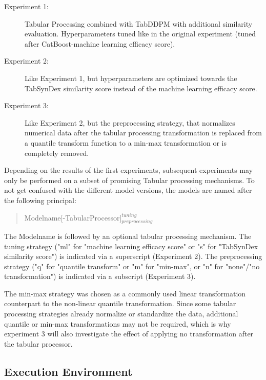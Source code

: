 \begin{description}
	\item[Experiment 1:] Tabular Processing combined with TabDDPM with additional similarity evaluation. Hyperparameters tuned like in the original experiment (tuned after CatBoost-machine learning efficacy score).
	\item[Experiment 2:] Like Experiment 1, but hyperparameters are optimized towards the TabSynDex similarity score instead of the machine learning efficacy score.
	\item[Experiment 3:] Like Experiment 2, but the preprocessing strategy, that normalizes numerical data after the tabular processing transformation is replaced from a quantile transform function to a min-max transformation or is completely removed.
\end{description}

\noindent Depending on the results of the first experiments, subsequent experiments may only be performed on a subset of promising Tabular processing mechanisms.
To not get confused with the different model versions, the models are named after the following principal:
\begin{quote}
Modelname[-TabularProcessor]$^{tuning}_{preprocessing}$
\end{quote}
The Modelname is followed by an optional tabular processing mechanism.
The tuning strategy ("ml" for "machine learning efficacy score" or "s" for "TabSynDex similarity score") is indicated via a superscript (Experiment 2).
The preprocessing strategy ("q" for "quantile transform" or "m" for "min-max", or "n" for "none"/"no transformation") is indicated via a subscript (Experiment 3).

The min-max strategy was chosen as a commonly used linear transformation counterpart to the non-linear quantile transformation.
Since some tabular processing strategies already normalize or standardize the data, additional quantile or min-max transformations may not be required, 
which is why experiment 3 will also investigate the effect of applying no transformation after the tabular processor.

\subsection{Execution Environment}
\label{ch:environment}

